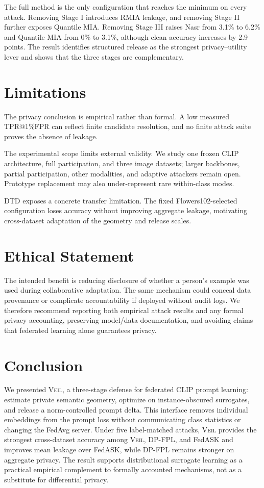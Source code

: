 \documentclass[letterpaper]{article}
\makeatletter
\newcommand{\method}{\textsc{Veil}}
\newcommand{\tpr}{\ensuremath{\mathrm{TPR}@1\%\mathrm{FPR}}}
\makeatother
\begin{document}
The full method is the only configuration that reaches the minimum on every
attack.  Removing Stage I introduces RMIA leakage, and removing Stage II further
exposes Quantile MIA.  Removing Stage III raises Nasr from 3.1\% to 6.2\% and
Quantile MIA from 0\% to 3.1\%, although clean accuracy increases by 2.9 points.
The result identifies structured release as the strongest privacy--utility
lever and shows that the three stages are complementary.

\section{Limitations}

The privacy conclusion is empirical rather than formal.  A low measured \tpr{}
can reflect finite candidate resolution, and no finite attack suite proves the
absence of leakage.

The experimental scope limits external validity.  We study one frozen CLIP
architecture, full participation, and three image datasets; larger backbones,
partial participation, other modalities, and adaptive attackers remain open.
Prototype replacement may also under-represent rare within-class modes.

DTD exposes a concrete transfer limitation.  The fixed Flowers102-selected
configuration loses accuracy without improving aggregate leakage, motivating
cross-dataset adaptation of the geometry and release scales.

\section{Ethical Statement}

The intended benefit is reducing disclosure of whether a person's example was
used during collaborative adaptation.  The same mechanism could conceal data
provenance or complicate accountability if deployed without audit logs.  We
therefore recommend reporting both empirical attack results and any formal
privacy accounting, preserving model/data documentation, and avoiding claims
that federated learning alone guarantees privacy.

\section{Conclusion}

We presented \method{}, a three-stage defense for federated CLIP prompt learning:
estimate private semantic geometry, optimize on instance-obscured surrogates,
and release a norm-controlled prompt delta.  This interface removes individual
embeddings from the prompt loss without communicating class statistics or
changing the FedAvg server.  Under five label-matched attacks, \method{} provides
the strongest cross-dataset accuracy among \method{}, DP-FPL, and FedASK and
improves mean leakage over FedASK, while DP-FPL remains stronger on aggregate
privacy.  The result supports distributional
surrogate learning as a practical empirical complement to formally accounted
mechanisms, not as a substitute for differential privacy.




\end{document}
